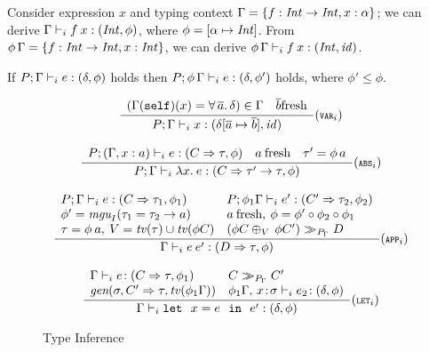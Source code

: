 \begin{Example} {\rm
Consider expression $x$ and ty\-ping context $\Gamma = \{ f: {\it Int\/}
\rightarrow {\it Int}, x:\alpha \}$; we can derive $\Gamma \vdash_i f\: x:
({\it Int\/}, \phi)$, where $\phi = [\alpha \mapsto {\it Int\/}]$. From
$\phi\,\Gamma = \{ f: {\it Int\/} \rightarrow {\it Int\/}, x:{\it Int\/} \}$, we can derive
$\phi\,\Gamma \vdash_i f\: x:({\it Int\/},{\it id\/})$.}
\end{Example}

\begin{Theorem}

If $P;\Gamma \vdash_i e:(\delta,\phi)$ holds then $P;\phi\,\Gamma \vdash_i
e:(\delta,\phi')$ holds, where $\phi'\leq \phi$.

\label{Minimal-type-minimal-typing-context}
\end{Theorem}

\begin{figure}
\[ \begin{array}{cc}
      \displaystyle\frac
        {\begin{array}[t]{ll}
            (\Gamma(\self)(x) = \forall\,\overline{a}.\,\delta) \in \Gamma &
            \overline{b} \mbox{{\rm fresh}}
         \end{array}}
        {P;\Gamma \ti x: (\delta[\overline{a} \mapsto \overline{b}], \id)} (\VVARi) \\ \\

	\displaystyle\frac
          {\begin{array}[t]{lll}
            P;(\Gamma,x:a) \ti e: (C \Rightarrow \tau,\phi) & a\: \mbox{{\rm fresh}} & \tau' = \phi\,a
           \end{array}}
	  {P;\Gamma \ti \lambda x.\:e: (C\Rightarrow \tau' \rightarrow \tau, \phi)} (\ABSi) \\ \\

	\displaystyle\frac
	 {\begin{array}[t]{ll}
             P;\Gamma \ti e: (C \Rightarrow \tau_1, \phi_1) & P;\phi_1\Gamma \ti e': (C' \Rightarrow \tau_2, \phi_2)\\
             \phi' = \mguI(\tau_1 = \tau_2\rightarrow a) & a\: \mbox{{\rm fresh}}, \:
                \phi = \phi' \circ \phi_2 \circ \phi_1\:\: \  \\
             \tau = \phi\:a, \: V = \tv(\tau) \cup \tv(\phi C) & (\phi C \oplus_V\,\phi C') \simplifies{P_\Gamma} D
           \end{array}}
	  {\Gamma \ti e\:e': (D\Rightarrow \tau,\phi)} (\APPi) \\ \\

	\displaystyle\frac
	  {\begin{array}{ll}
             \Gamma \ti e\!:(C\Rightarrow \tau,\phi_1) & C \simplifies {P_\Gamma} C' \\
             \gen(\sigma,C'\Rightarrow \tau,\tv(\phi_1\Gamma)) & \phi_1\Gamma,\,x\!:\!\sigma \ti e_2\!:(\delta,\phi)
          \end{array}}
	 {\Gamma \ti \mlet\ x=e\ \iin\ e':(\delta,\phi)} (\LETi)
\end{array} \]
\caption{Type Inference}
\label{Type-inference-fig}
\end{figure}

